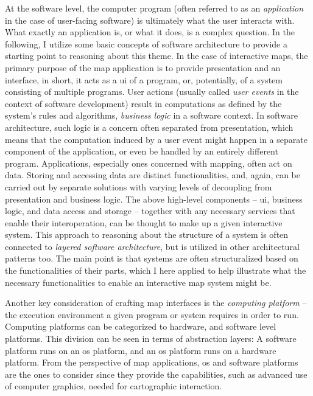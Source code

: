At the software level, the computer program
(often referred to as an \textit{application} in the case of user-facing software)
is ultimately what the user interacts with.
What exactly an application is, or what it does, is a complex question.
In the following, I utilize some basic concepts of software architecture
to provide a starting point to reasoning about this theme.
In the case of interactive maps,
the primary purpose of the map application is
to provide presentation and an interface,
in short, it acts as a \acrshort{ui} of
a program, or, potentially, of a system consisting of multiple programs.
User actions
(usually called \textit{user events} in the context of software development)
result in computations as defined by the system's rules and algorithms,
\textit{business logic} in a software context.
In software architecture, such logic is a concern often separated from presentation,
which means that the computation induced by a user event might happen
in a separate component of the application,
or even be handled by an entirely different program.
Applications, especially ones concerned with mapping,
often act on data.
Storing and accessing data are distinct functionalities, and, again,
can be carried out by separate solutions
with varying levels of decoupling from presentation and business logic.
The above high-level components --
\acrshort{ui}, business logic, and data access and storage --
together with any necessary services that enable their interoperation,
can be thought to make up a given interactive system.
This approach to reasoning about the structure of a system is often connected to
\textit{layered software architecture},
but is utilized in other architectural patterns too. %
The main point is that
systems are often structuralized based on the functionalities of their parts,
which I here applied to help illustrate what the necessary functionalities
to enable an interactive map system might be.

Another key consideration of crafting map interfaces is the
\textit{computing platform} --
the execution environment a given program or system requires in order to run.
Computing platforms can be categorized to
hardware,  and software level platforms.
This division can be seen in terms of abstraction layers:
A software platform runs on an \acrshort{os} platform,
and an \acrshort{os} platform runs on a hardware platform.
From the perspective of map applications,
\acrshort{os} and software platforms
are the ones to consider since they provide the capabilities,
such as advanced use of computer graphics,
needed for cartographic interaction.

